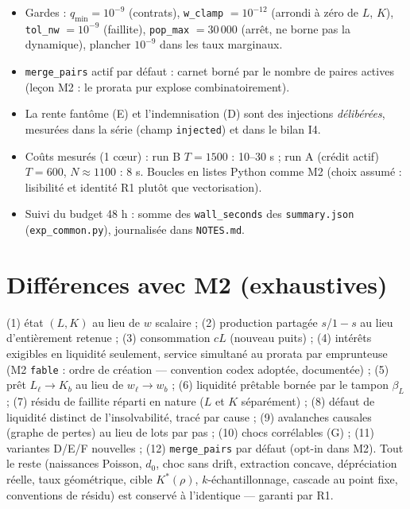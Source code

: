 \documentclass[11pt,a4paper]{article}
\newcommand{\code}[1]{\texttt{#1}}
\begin{document}
\begin{itemize}[leftmargin=1.5em, itemsep=2pt]
\item Gardes : $q_{\min} = 10^{-9}$ (contrats), \code{w\_clamp} $= 10^{-12}$
  (arrondi à zéro de $L$, $K$), \code{tol\_nw} $= 10^{-9}$ (faillite),
  \code{pop\_max} $= 30\,000$ (arrêt, ne borne pas la dynamique),
  plancher $10^{-9}$ dans les taux marginaux.
\item \code{merge\_pairs} actif par défaut : carnet borné par le nombre de
  paires actives (leçon M2 : le prorata pur explose combinatoirement).
\item La rente fantôme (E) et l'indemnisation (D) sont des injections
  \emph{délibérées}, mesurées dans la série (champ \code{injected}) et dans
  le bilan I4.
\item Coûts mesurés (1 cœur) : run B $T{=}1500$ : 10--30 s ; run A (crédit
  actif) $T{=}600$, $N \approx 1100$ : 8 s. Boucles en listes Python comme
  M2 (choix assumé : lisibilité et identité R1 plutôt que vectorisation).
\item Suivi du budget 48 h : somme des \code{wall\_seconds} des
  \code{summary.json} (\code{exp\_common.py}), journalisée dans
  \code{NOTES.md}.
\end{itemize}

\section{Différences avec M2 (exhaustives)}

(1) état $(L, K)$ au lieu de $w$ scalaire ; (2) production partagée
$s$/$1{-}s$ au lieu d'entièrement retenue ; (3) consommation $cL$ (nouveau
puits) ; (4) intérêts exigibles en liquidité seulement, service simultané au
prorata par emprunteuse (M2 \code{fable} : ordre de création — convention
codex adoptée, documentée) ; (5) prêt $L_\ell \to K_b$ au lieu de
$w_\ell \to w_b$ ; (6) liquidité prêtable bornée par le tampon $\beta_L$ ;
(7) résidu de faillite réparti en nature ($L$ et $K$ séparément) ;
(8) défaut de liquidité distinct de l'insolvabilité, tracé par cause ;
(9) avalanches causales (graphe de pertes) au lieu de lots par pas ;
(10) chocs corrélables (G) ; (11) variantes D/E/F nouvelles ;
(12) \code{merge\_pairs} par défaut (opt-in dans M2).
Tout le reste (naissances Poisson, $d_0$, choc sans drift, extraction
concave, dépréciation réelle, taux géométrique, cible $K^*(\rho)$,
$k$-échantillonnage, cascade au point fixe, conventions de résidu) est
conservé à l'identique --- garanti par R1.
\end{document}
